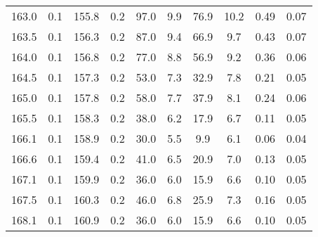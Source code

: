 \begin{tabular}{SSSSSSSSSS}
163.0 & 0.1 & 155.8 & 0.2 & 97.0  & 9.9  & 76.9  & 10.2 & 0.49 & 0.07 \\
163.5 & 0.1 & 156.3 & 0.2 & 87.0  & 9.4  & 66.9  & 9.7  & 0.43 & 0.07 \\
164.0 & 0.1 & 156.8 & 0.2 & 77.0  & 8.8  & 56.9  & 9.2  & 0.36 & 0.06 \\
164.5 & 0.1 & 157.3 & 0.2 & 53.0  & 7.3  & 32.9  & 7.8  & 0.21 & 0.05 \\
165.0 & 0.1 & 157.8 & 0.2 & 58.0  & 7.7  & 37.9  & 8.1  & 0.24 & 0.06 \\
165.5 & 0.1 & 158.3 & 0.2 & 38.0  & 6.2  & 17.9  & 6.7  & 0.11 & 0.05 \\
166.1 & 0.1 & 158.9 & 0.2 & 30.0  & 5.5  & 9.9   & 6.1  & 0.06 & 0.04 \\
166.6 & 0.1 & 159.4 & 0.2 & 41.0  & 6.5  & 20.9  & 7.0  & 0.13 & 0.05 \\
167.1 & 0.1 & 159.9 & 0.2 & 36.0  & 6.0  & 15.9  & 6.6  & 0.10 & 0.05 \\
167.5 & 0.1 & 160.3 & 0.2 & 46.0  & 6.8  & 25.9  & 7.3  & 0.16 & 0.05 \\
168.1 & 0.1 & 160.9 & 0.2 & 36.0  & 6.0  & 15.9  & 6.6  & 0.10 & 0.05 \\
\bottomrule
\end{tabular}